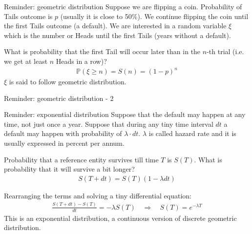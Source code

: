 \documentclass{beamer}
\begin{document}
\begin{frame}{Reminder: geometric distribution}
\justify
Suppose we are flipping a coin. Probability of Tails outcome is $p$ (usually it is close to 50\%). We continue flipping the coin until the first Tails outcome (a default). We are interested in a random variable $\xi$ which is the number or Heads until the first Tails (years without a default).

\justify
What is probability that the first Tail will occur later than in the $n$-th trial (i.e. we get at least $n$ Heads in a row)?
\begin{align*}
\mathbb{P}(\xi \ge n) = S(n) = (1 - p)^{n}
\end{align*}
\justify
$\xi$ is said to follow geometric distribution.
\end{frame}



\begin{frame}{Reminder: geometric distribution - 2}
\centering
{}
\end{frame}



\begin{frame}{Reminder: exponential distribution}
\justify
Suppose that the default may happen at any time, not just once a year. Suppose that during any tiny time interval $dt$ a default may happen with probability of $\lambda \cdot dt$. $\lambda$ is called \alert{hazard rate} and it is usually expressed in percent per annum.

\justify
Probability that a reference entity survives till time $T$ is $S(T)$. What is probability that it will survive a bit longer?
\begin{align*}
S(T+dt) = S(T)(1 - \lambda dt)
\end{align*}

\justify
Rearranging the terms and solving a tiny differential equation:
\begin{align*}
\frac{S(T+dt) - S(T)}{dt} = -\lambda S(T) \quad
\Rightarrow
\quad
S(T) = e^{-\lambda T}
\end{align*}
\justify
This is an exponential distribution, a continuous version of discrete geometric distribution.
\end{frame}
\end{document}
